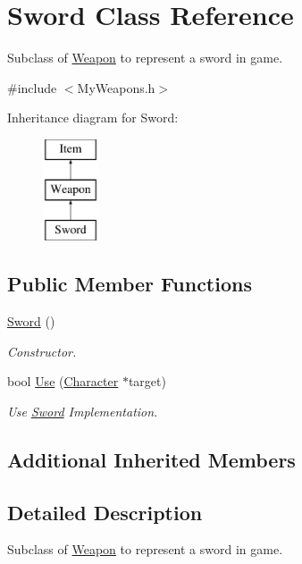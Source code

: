 \hypertarget{classSword}{\section{Sword Class Reference}
\label{classSword}
}


Subclass of \hyperlink{classWeapon}{Weapon} to represent a sword in game.  




{\ttfamily \#include $<$My\-Weapons.\-h$>$}

Inheritance diagram for Sword\-:\begin{figure}[H]
\begin{center}
\leavevmode
\includegraphics[height=3.000000cm]{classSword}
\end{center}
\end{figure}
\subsection*{Public Member Functions}
\begin{DoxyCompactItemize}
\item 
\hyperlink{classSword_af33284e40825ec8ddccd01fa5833be36}{Sword} ()
\begin{DoxyCompactList}\small\item\em Constructor. \end{DoxyCompactList}\item 
bool \hyperlink{classSword_a95e6215b5a27b6d2edc5c59e2a2a408b}{Use} (\hyperlink{classCharacter}{Character} $\ast$target)
\begin{DoxyCompactList}\small\item\em Use \hyperlink{classSword}{Sword} Implementation. \end{DoxyCompactList}\end{DoxyCompactItemize}
\subsection*{Additional Inherited Members}


\subsection{Detailed Description}
Subclass of \hyperlink{classWeapon}{Weapon} to represent a sword in game. 

